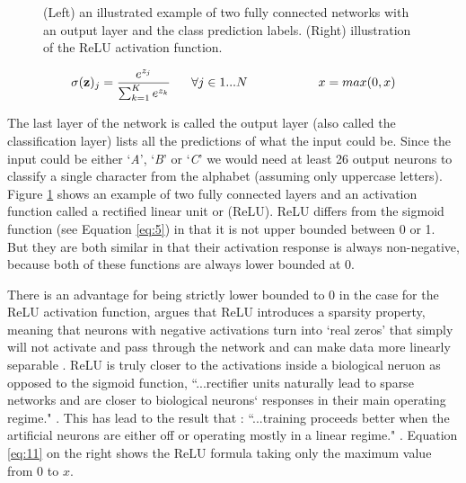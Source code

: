 \documentclass[report, 11pt, oneside]{dissertation}
\begin{document}
\begin{figure}[!htb]
\begin{subfigure}{0.5\textwidth}
	\end{subfigure}
	\caption[Fully Connected Network \& ReLU.]{(Left) an illustrated example of two fully connected networks with an output layer and the class prediction labels. (Right) illustration of the ReLU activation function.}\label{fig:fully_connected_output_layers_relu}
\end{figure}

\begin{equation} 
\begin{subequations}
		\sigma(\mathbf{z})_j = \frac{e^{z_j}}{\sum_{k=1}^K e^{z_k}} \ \ \ \ \ \forall j \in 1...N
\end{subequations}
\begin{subequations} \label{eq:11}
	\ \ \ \ \ \ \ \ \ \ \ \ \ \ \ \ \ x = max(0, x) 
\end{subequations}
\end{equation}

The last layer of the network is called the output layer (also called the classification layer) lists all the predictions of what the input could be. Since the input could be either `\textit{A}', `\textit{B}' or `\textit{C}' we would need at least 26 output neurons to classify a single character from the alphabet (assuming only uppercase letters). Figure \ref{fig:fully_connected_output_layers_relu} shows an example of two fully connected layers and an activation function called a rectified linear unit or (ReLU). ReLU differs from the sigmoid function (see Equation \ref{eq:5}) in that it is not upper bounded between 0 or 1. But they are both similar in that their activation response is always non-negative, because both of these functions are always lower bounded at 0.

There is an advantage for being strictly lower bounded to 0 in the case for the ReLU activation function, \citeauthor{Glorot:2011tm} argues that ReLU introduces a sparsity property, meaning that neurons with negative activations turn into `real zeros' that simply will not activate and pass through the network and can make data more linearly separable \citeyear[317]{Glorot:2011tm}. ReLU is truly closer to the activations inside a biological neruon as opposed to the sigmoid function, ``...rectifier units naturally lead to sparse networks and are closer to biological neurons` responses in their main operating regime." \citep[316]{Glorot:2011tm}. This has lead to the result that : ``...training proceeds better when the artificial neurons are either off or operating mostly in a linear regime." \citep[316]{Glorot:2011tm}. Equation \ref{eq:11} on the right shows the ReLU formula taking only the maximum value from 0 to $ x $. 
\end{document}
